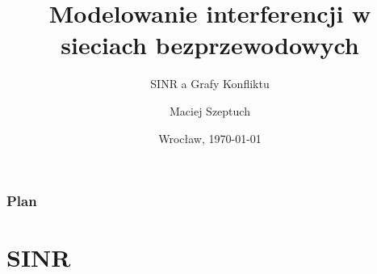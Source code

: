 \documentclass[polish, t,10pt]{beamer}
\title{Modelowanie interferencji w sieciach bezprzewodowych}
\subtitle{SINR a Grafy Konfliktu}
\author{Maciej Szeptuch}
\date{Wrocław, \today}
\begin{document}
\begin{frame}
    \titlepage
\end{frame}

\begin{frame}
    \frametitle{Plan}
    \tableofcontents
\end{frame}

\def \si {{\color{green}s_i}}
\def \sj {{\color{green}s_j}}
\def \sno {{\color{green}s_{n+1}}}
\def \snt {{\color{green}s_{n+2}}}

\def \ri {{\color{red}r_i}}
\def \rj {{\color{red}r_j}}
\def \rrj {{\color{red}j}}
\def \rno {{\color{red}r_{n+1}}}
\def \rnt {{\color{red}r_{n+2}}}

\def \Li {{\color{blue}L_i}}
\def \li {{\color{blue}l_i}}
\def \Lj {{\color{blue}L_j}}
\def \lj {{\color{blue}l_j}}
\def \Lo {{\color{blue}L_1}}
\def \Ln {{\color{blue}L_n}}
\def \Lno {{\color{blue}L_{n+1}}}
\def \Lnt {{\color{blue}L_{n+2}}}
\def \Lm {{\color{blue}L_m}}

\def \dii {{\color{cyan}d_{i.i}}}
\def \dij {{\color{cyan}d_{i.j}}}
\def \dji {{\color{cyan}d_{j.i}}}
\def \djj {{\color{cyan}d_{j.j}}}

\section{SINR}
\end{document}
